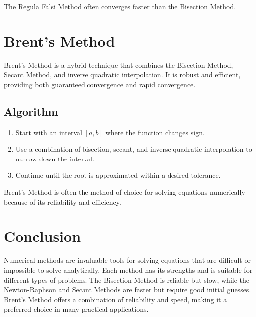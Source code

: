 \documentclass[12pt]{article}
\begin{document}
The Regula Falsi Method often converges faster than the Bisection Method.

\section*{Brent's Method}

Brent's Method is a hybrid technique that combines the Bisection Method, Secant Method, and inverse quadratic interpolation. It is robust and efficient, providing both guaranteed convergence and rapid convergence.

\subsection*{Algorithm}
\begin{enumerate}
    \item Start with an interval \([a, b]\) where the function changes sign.
    \item Use a combination of bisection, secant, and inverse quadratic interpolation to narrow down the interval.
    \item Continue until the root is approximated within a desired tolerance.
\end{enumerate}

Brent's Method is often the method of choice for solving equations numerically because of its reliability and efficiency.

\section*{Conclusion}

Numerical methods are invaluable tools for solving equations that are difficult or impossible to solve analytically. Each method has its strengths and is suitable for different types of problems. The Bisection Method is reliable but slow, while the Newton-Raphson and Secant Methods are faster but require good initial guesses. Brent's Method offers a combination of reliability and speed, making it a preferred choice in many practical applications.
\end{document}
